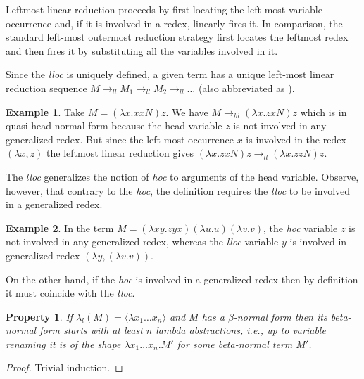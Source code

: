 \documentclass{elsarticle}
\makeatletter
\theoremstyle{plain}
\newtheorem{property}[theorem]{Property}
\theoremstyle{definition}
\newtheorem{example}{Example}[section]
\theoremstyle{remark}
\renewcommand\ie{{\it i.e.\@\xspace}}
\newcommand{\hlred}{\rightarrow_{hl}}
\newcommand{\llred}{\rightarrow_{ll}}
\makeatother
\begin{document}
Leftmost linear reduction proceeds by first locating the left-most variable occurrence and, if it is involved in a redex, linearly fires it. In comparison, the standard left-most outermost reduction strategy first locates the leftmost redex and then fires it by substituting all the variables involved in it.

Since the \emph{lloc} is uniquely defined, a given term has a unique left-most linear reduction sequence $M \llred M_1 \llred M_2 \llred \ldots$ (also abbreviated as ).

\begin{example}
Take $M = (\lambda x. x x N) z$. We have $M \hlred (\lambda x. z x N) z$ which is in quasi head normal form because the head variable $z$ is not involved in any generalized redex.
But since the left-most occurrence $x$ is involved in the redex $(\lambda x, z)$ the leftmost linear reduction gives $(\lambda x. z x N) z \llred (\lambda x. z z N) z$.
\end{example}

The \emph{lloc} generalizes the notion of \emph{hoc} to arguments of the head variable. Observe, however, that contrary to the \emph{hoc}, the definition requires the \emph{lloc} to be involved in a generalized redex.
\begin{example}In the term $M = (\lambda x y . z y x) (\lambda u . u) (\lambda v . v)$, the \emph{hoc} variable $z$ is not involved in any generalized redex, whereas the \emph{lloc} variable $y$ is involved in generalized redex $(\lambda y, (\lambda v.v))$.
\end{example}
On the other hand, if the \emph{hoc} is involved in a generalized redex then by definition it must coincide with the \emph{lloc}.

\begin{property}
    If $\lambda_l(M) = \langle \lambda x_1 \ldots x_n \rangle$ and $M$ has a $\beta$-normal form then its beta-normal form starts with at least $n$ lambda abstractions, \ie, up to variable renaming it is of the shape $\lambda x_1 \ldots x_n . M'$ for some beta-normal term $M'$.
\end{property}
\begin{proof}
    Trivial induction.
\end{proof}
\end{document}
